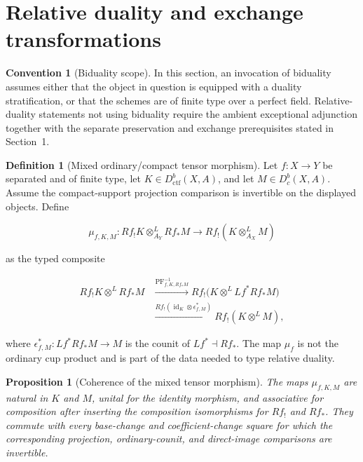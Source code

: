 \documentclass[10pt]{article}
\newtheorem{proposition}[theorem]{Proposition}
\theoremstyle{definition}
\newtheorem{definition}[theorem]{Definition}
\newtheorem{convention}[theorem]{Convention}
\newcommand{\Dbc}{D^b_c}
\newcommand{\Dctf}{D^b_{\mathrm{ctf}}}
\begin{document}
\section{Relative duality and exchange transformations}

\begin{convention}[Biduality scope]
In this section, an invocation of biduality assumes either that the object in
question is equipped with a duality stratification, or that the schemes are
of finite type over a perfect field.  Relative-duality statements not using
biduality require the ambient exceptional adjunction together with the
separate preservation and exchange prerequisites stated in Section~1.
\end{convention}

\begin{definition}[Mixed ordinary/compact tensor morphism]
Let \(f:X\to Y\) be separated and of finite type, let
\(K\in\Dctf(X,A)\), and let \(M\in\Dbc(X,A)\).  Assume the compact-support
projection comparison is invertible on the displayed objects.  Define

\[
 \mu_{f,K,M}:Rf_!K\otimes^L_{A_Y}Rf_*M
 \longrightarrow Rf_!(K\otimes^L_{A_X}M)
\]

as the typed composite

\[
\begin{aligned}
 Rf_!K\otimes^LRf_*M
 &\xrightarrow{\operatorname{PF}_{f,K,Rf_*M}^{-1}}
 Rf_!\bigl(K\otimes^LLf^*Rf_*M\bigr)\\
 &\xrightarrow{Rf_!(\operatorname{id}_K\otimes\epsilon^*_{f,M})}
 Rf_!(K\otimes^LM),
\end{aligned}
\]

where
\(\epsilon^*_{f,M}:Lf^*Rf_*M\to M\) is the counit of
\(Lf^*\dashv Rf_*\).  The map \(\mu_f\) is not the ordinary cup product and
is part of the data needed to type relative duality.
\end{definition}

\begin{proposition}[Coherence of the mixed tensor morphism]
The maps \(\mu_{f,K,M}\) are natural in \(K\) and \(M\), unital for the
identity morphism, and associative for composition after inserting the
composition isomorphisms for \(Rf_!\) and \(Rf_*\).  They commute with every
base-change and coefficient-change square for which the corresponding
projection, ordinary-counit, and direct-image comparisons are invertible.
\end{proposition}
\end{document}
